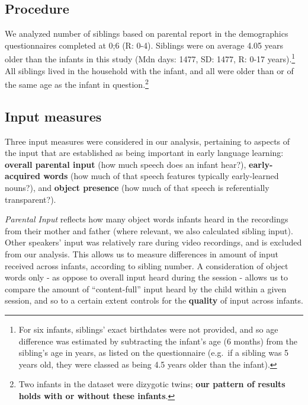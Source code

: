 \documentclass[
  english,
  man,floatsintext]{apa6}
\begin{document}
\hypertarget{procedure}{%
\subsection{Procedure}\label{procedure}}

We analyzed number of siblings based on parental report in the demographics questionnaires completed at 0;6 (R: 0-4). Siblings were on average 4.05 years older than the infants in this study (Mdn days: 1477, SD: 1477, R: 0-17 years).\footnote{For six infants, siblings' exact birthdates were not provided, and so age difference was estimated by subtracting the infant's age (6 months) from the sibling's age in years, as listed on the questionnaire (e.g.~if a sibling was 5 years old, they were classed as being 4.5 years older than the infant).} All siblings lived in the household with the infant, and all were older than or of the same age as the infant in question.\footnote{Two infants in the dataset were dizygotic twins; \textbf{our pattern of results holds with or without these infants}.}

\hypertarget{input-measures}{%
\subsection{Input measures}\label{input-measures}}

Three input measures were considered in our analysis, pertaining to aspects of the input that are established as being important in early language learning: \textbf{overall parental input} (how much speech does an infant hear?), \textbf{early-acquired words} (how much of that speech features typically early-learned nouns?), and \textbf{object presence} (how much of that speech is referentially transparent?).

\emph{Parental Input} reflects how many object words infants heard in the recordings from their mother and father (where relevant, we also calculated sibling input). Other speakers' input was relatively rare during video recordings, and is excluded from our analysis. This allows us to measure differences in amount of input received across infants, according to sibling number. A consideration of object words only - as oppose to overall input heard during the session - allows us to compare the amount of \enquote{content-full} input heard by the child within a given session, and so to a certain extent controls for the \textbf{quality} of input across infants.
\end{document}
